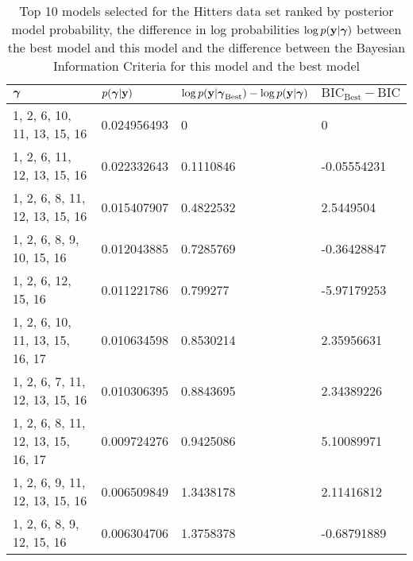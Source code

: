\documentclass{amsart}
\begin{document}
\begin{table}
\label{tab:numerical_results_hitters}
\caption{Top 10 models selected for the Hitters data set ranked by posterior model probability, the difference
					in log probabilities $\log p({\bf y}|{\boldsymbol \gamma})$ between the best model and this model and the difference
					between the Bayesian Information Criteria for this model and the best model}
\begin{tabular}{|l|lll|}
\hline
${\boldsymbol \gamma}$ & $p({\boldsymbol \gamma}|{\bf y})$ & $\log p({\bf y} | {\boldsymbol \gamma}_\text{Best}) - \log p({\bf y} | {\boldsymbol \gamma})$ & $\text{BIC}_\text{Best} - \text{BIC}$ \\
\hline
1, 2, 6, 10, 11, 13, 15, 16 & 0.024956493 & 0 &	0 \\
1, 2, 6, 11, 12, 13, 15, 16 & 0.022332643	& 0.1110846 &	-0.05554231 \\
1, 2, 6, 8, 11, 12, 13, 15, 16 & 0.015407907 & 0.4822532 & 2.5449504 \\
1, 2, 6, 8, 9, 10, 15, 16 & 0.012043885 & 0.7285769 & -0.36428847 \\
1, 2, 6, 12, 15, 16 & 0.011221786 & 0.799277 & -5.97179253 \\
1, 2, 6, 10, 11, 13, 15, 16, 17 & 0.010634598 & 0.8530214 & 2.35956631 \\
1, 2, 6, 7, 11, 12, 13, 15, 16 & 0.010306395 & 0.8843695 & 2.34389226 \\
1, 2, 6, 8, 11, 12, 13, 15, 16, 17 & 0.009724276 & 0.9425086 & 5.10089971 \\
1, 2, 6, 9, 11, 12, 13, 15, 16 & 0.006509849 & 1.3438178 & 2.11416812 \\
1, 2, 6, 8, 9, 12, 15, 16 & 0.006304706 & 1.3758378 & -0.68791889 \\
\hline
\end{tabular}
\end{table}
\end{document}
